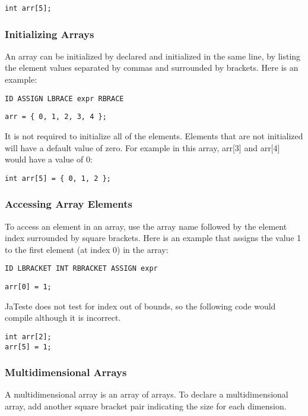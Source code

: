 \documentclass{article}
\begin{document}
 \begin{lstlisting}
int arr[5];
\end{lstlisting}

\subsubsection{Initializing Arrays}
An array can be initialized by declared and initialized in the same line, by listing the element values separated by commas and surrounded by brackets. Here is an example:

\begin{Verbatim}[frame=single]
ID ASSIGN LBRACE expr RBRACE
\end{Verbatim}

 \begin{lstlisting}
arr = { 0, 1, 2, 3, 4 };
\end{lstlisting}

It is not required to initialize all of the elements. Elements that are not initialized will have a default value of zero. For example in this array, arr[3] and arr[4] would have a value of 0:

 \begin{lstlisting}
int arr[5] = { 0, 1, 2 };
\end{lstlisting}

\subsubsection{Accessing Array Elements}
To access an element in an array, use the array name followed by the element index surrounded by square brackets. Here is an example that assigns the value 1 to the first element (at index 0) in the array:

\begin{Verbatim}[frame=single]
ID LBRACKET INT RBRACKET ASSIGN expr
\end{Verbatim}

 \begin{lstlisting}
arr[0] = 1;
\end{lstlisting}

JaTeste does not test for index out of bounds, so the following code would compile although it is incorrect. 

 \begin{lstlisting}
int arr[2];
arr[5] = 1;
\end{lstlisting}


\subsubsection{Multidimensional Arrays}
A multidimensional array is an array of arrays. To declare a multidimensional array, add another square bracket pair indicating the size for each dimension. 
\end{document}
